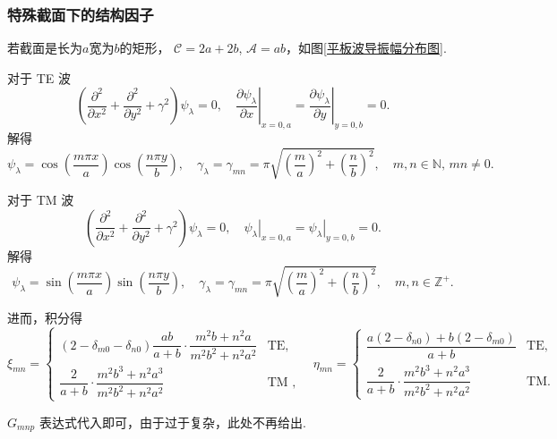 \subsubsection{特殊截面下的结构因子}
\begin{example}
	若截面是长为\(a\)宽为\(b\)的矩形， \(\mathcal{C} = 2a + 2b\), \(\mathcal{A} = ab\)，如图\ref{平板波导振幅分布图}.

	对于 TE 波
	\begin{equation*}
		\left( \dfrac{\partial^2}{\partial x^2} + \dfrac{\partial^2}{\partial y^2} + \gamma^2 \right) \psi_\lambda = 0, \quad \left. \dfrac{\partial \psi_\lambda}{\partial x} \right|_{x=0,a} = \left. \dfrac{\partial \psi_\lambda}{\partial y} \right|_{y=0,b} = 0.
	\end{equation*}
	解得
	\begin{equation*}
		\psi_\lambda = \cos\left( \dfrac{m\pi x}{a} \right) \cos\left( \dfrac{n\pi y}{b} \right), \quad \gamma_\lambda = \gamma_{mn} = \pi \sqrt{\left( \dfrac{m}{a} \right)^2 + \left( \dfrac{n}{b} \right)^2}, \quad m, n\in \mathbb{N},\,mn\neq0.
	\end{equation*}

	对于 TM 波
	\begin{equation*}
		\left( \dfrac{\partial^2}{\partial x^2} + \dfrac{\partial^2}{\partial y^2} + \gamma^2 \right) \psi_\lambda = 0, \quad \left. \psi_\lambda \right|_{x=0,a} = \left. \psi_\lambda \right|_{y=0,b} = 0.
	\end{equation*}
	解得
	\begin{equation*}
		\psi_\lambda = \sin\left( \dfrac{m\pi x}{a} \right) \sin\left( \dfrac{n\pi y}{b} \right), \quad \gamma_\lambda = \gamma_{mn} = \pi \sqrt{\left( \dfrac{m}{a} \right)^2 + \left( \dfrac{n}{b} \right)^2}, \quad m, n \in \mathbb{Z}^+.
	\end{equation*}

	进而，积分得
	\begin{equation*}
		\xi_{mn} =
		\begin{cases}
			\left( 2 - \delta_{m0} - \delta_{n0} \right) \dfrac{ab}{a + b} \cdot \dfrac{m^2 b + n^2 a}{m^2 b^2 + n^2 a^2} & \text{TE},  \\[8pt]
			\dfrac{2}{a + b} \cdot \dfrac{m^2 b^3 + n^2 a^3}{m^2 b^2 + n^2 a^2}                                           & \text{TM },
		\end{cases}
		\quad
		\eta_{mn} =
		\begin{cases}
			\dfrac{a \left( 2 - \delta_{n0} \right) + b \left( 2 - \delta_{m0} \right)}{a + b} & \text{TE}, \\[8pt]
			\dfrac{2}{a + b} \cdot \dfrac{m^2 b^3 + n^2 a^3}{m^2 b^2 + n^2 a^2}                & \text{TM}.
		\end{cases}
	\end{equation*}

	\(G_{mnp}\) 表达式代入即可，由于过于复杂，此处不再给出.
\end{example}

